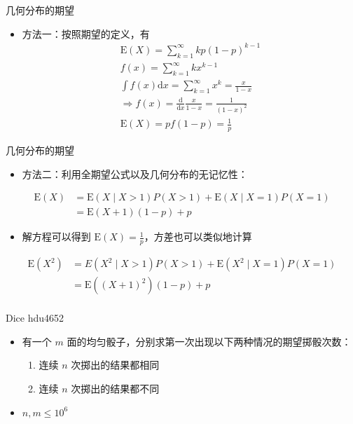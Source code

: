 \documentclass{beamer}
\newcommand{\E}{\text{E}}
\renewcommand{\d}{\text{d}}
\begin{document}
    \begin{frame}{几何分布的期望}
        \begin{itemize}
            \item 方法一：按照期望的定义，有
            \begin{gather*}
                \E(X)=\sum_{k=1}^{\infty} kp(1-p)^{k-1} \\
                f(x) = \sum_{k=1}^{\infty} kx^{k-1} \\
                \int f(x) \d x = \sum_{k=1}^{\infty} x^k = \frac{x}{1-x} \\
                \Rightarrow f(x) = \frac{\d}{\d x} \frac{x}{1-x} = \frac1{(1-x)^2} \\
                \E(X) = pf(1-p) = \frac1p
            \end{gather*}
        \end{itemize}
    \end{frame}

    \begin{frame}{几何分布的期望}
        \begin{itemize}
            \item 方法二：利用全期望公式以及几何分布的无记忆性：
        \end{itemize}
        \begin{align*}
            \E(X) 
            &= \E(X \mid X>1)P(X>1) + \E(X\mid X=1)P(X=1) \\
            &= \E(X+1)(1-p)+p
        \end{align*}
        \begin{itemize}
            \item 解方程可以得到 $\E(X)=\frac1p$，方差也可以类似地计算
        \end{itemize}
        \begin{align*}
            \E(X^2) 
            &= E(X^2 \mid X>1)P(X>1) + \E(X^2 \mid X=1)P(X=1) \\
            &= \E\left((X+1)^2\right)(1-p)+p \\
        \end{align*}
    \end{frame}

    \begin{frame}{Dice}
        {hdu4652}
        \begin{itemize}
            \setlength{\itemsep}{10pt}
            \item 有一个 $m$ 面的均匀骰子，分别求第一次出现以下两种情况的期望掷骰次数：
            \begin{enumerate}
                \item 连续 $n$ 次掷出的结果都相同
                \item 连续 $n$ 次掷出的结果都不同
            \end{enumerate}
            \item $n,m\le 10^6$
        \end{itemize}
    \end{frame}
\end{document}
